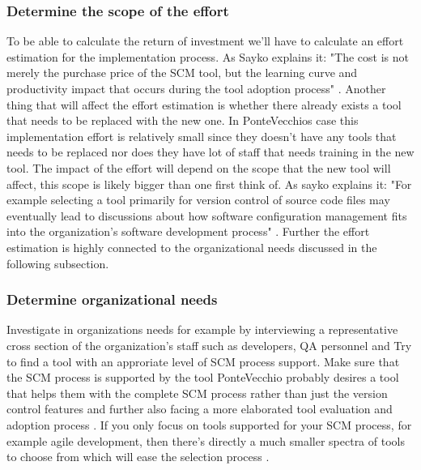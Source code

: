 \documentclass[10pt]{article}
\begin{document}
\subsubsection{Determine the scope of the effort}
To be able to calculate the return of investment we'll have to calculate an effort estimation for the implementation process. As Sayko explains it: "The cost is not merely the purchase price of the SCM tool, but the learning curve and productivity impact that occurs during the tool adoption process" \cite{Sayko}. Another thing that will affect the effort estimation is whether there already exists a tool that needs to be replaced with the new one. In PonteVecchios case this implementation effort is relatively small since they doesn't have any tools that needs to be replaced nor does they have lot of staff that needs training in the new tool. The impact of the effort will depend on the scope that the new tool will affect, this scope is likely bigger than one first think of. As sayko explains it: "For example selecting a tool primarily for version control of source code files may eventually lead to discussions about how software configuration management fits into the organization's software development process" \cite{Sayko}. Further the effort estimation is highly connected to the organizational needs discussed in the following subsection.

\subsubsection{Determine organizational needs}
Investigate in organizations needs for example by interviewing a representative cross section of the organization's staff such as developers, QA personnel and 
Try to find a tool with an approriate level of SCM process support.
Make sure that the SCM process is supported by the tool
PonteVecchio probably desires a tool that helps them with the complete SCM process rather than just the version control features and further also facing a more elaborated tool evaluation and adoption process \cite{Sayko}. If you only focus on tools supported for your SCM process, for example agile development, then there's directly a much smaller spectra of tools to choose from which will ease the selection process \cite{Sayko}.
\end{document}
